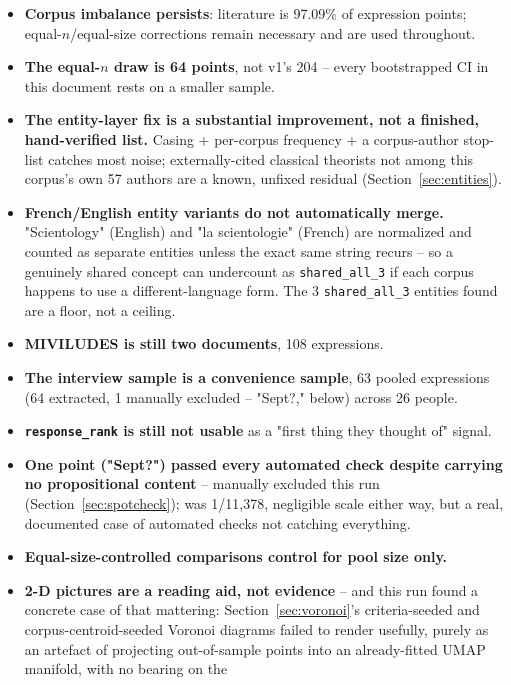\documentclass[11pt,a4paper]{article}
\begin{document}
\begin{itemize}[leftmargin=1.4em]
  \item \textbf{Corpus imbalance persists}: literature is 97.09\% of
  expression points; equal-$n$/equal-size corrections remain necessary
  and are used throughout.
  \item \textbf{The equal-$n$ draw is 64 points}, not v1's 204 --
  every bootstrapped CI in this document rests on a smaller sample.
  \item \textbf{The entity-layer fix is a substantial improvement, not a
  finished, hand-verified list.} Casing + per-corpus frequency + a
  corpus-author stop-list catches most noise; externally-cited classical
  theorists not among this corpus's own 57 authors are a known,
  unfixed residual (Section~\ref{sec:entities}).
  \item \textbf{French/English entity variants do not automatically
  merge.} "Scientology" (English) and "la scientologie" (French) are
  normalized and counted as separate entities unless the exact same
  string recurs -- so a genuinely shared concept can undercount as
  \texttt{shared\_all\_3} if each corpus happens to use a different-language
  form. The 3 \texttt{shared\_all\_3} entities found are a floor, not a ceiling.
  \item \textbf{MIVILUDES is still two documents}, 108 expressions.
  \item \textbf{The interview sample is a convenience sample}, 63 pooled
  expressions (64 extracted, 1 manually excluded -- "Sept?," below)
  across 26 people.
  \item \textbf{\texttt{response\_rank} is still not usable} as a
  "first thing they thought of" signal.
  \item \textbf{One point ("Sept?") passed every automated check despite
  carrying no propositional content} -- manually excluded this run
  (Section~\ref{sec:spotcheck}); was 1/11,378, negligible scale either
  way, but a real, documented case of automated checks not catching
  everything.
  \item \textbf{Equal-size-controlled comparisons control for pool size
  only.}
  \item \textbf{2-D pictures are a reading aid, not evidence} -- and this
  run found a concrete case of that mattering: Section~\ref{sec:voronoi}'s
  criteria-seeded and corpus-centroid-seeded Voronoi diagrams failed to
  render usefully, purely as an artefact of projecting out-of-sample
  points into an already-fitted UMAP manifold, with no bearing on the

\end{itemize}
\end{document}
